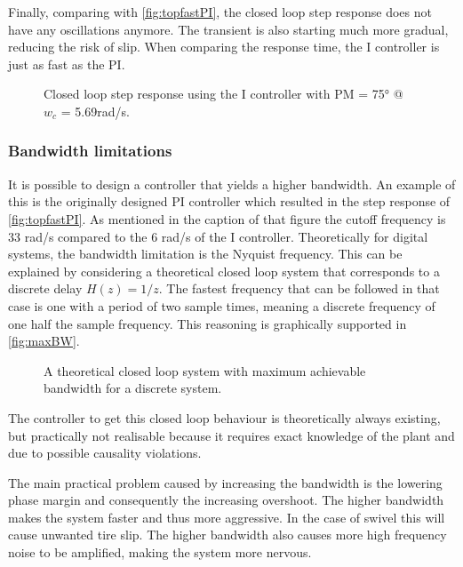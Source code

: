 \documentclass[a4paper]{article}
\newcommand{\newpar}{\vspace{.3cm}\noindent}
\begin{document}
\newpar
Finally, comparing with \autoref{fig:topfastPI}, the closed loop step response does not have any oscillations anymore. The transient is also starting much more gradual, reducing the risk of slip. When comparing the response time, the I controller is just as fast as the PI.

\begin{figure}[H]
    \caption{Closed loop step response using the I controller with PM = 75° @ $w_{c}$ = 5.69rad/s.}
    \label{fig:2_closedloopbode}
\end{figure}


\subsubsection{Bandwidth limitations}
It is possible to design a controller that yields a higher bandwidth. An example of this is the originally designed PI controller which resulted in the step response of \autoref{fig:topfastPI}. As mentioned in the caption of that figure the cutoff frequency is 33 rad/s compared to the 6 rad/s of the I controller. Theoretically for digital systems, the bandwidth limitation is the Nyquist frequency. This can be explained by considering a theoretical closed loop system that corresponds to a discrete delay $H(z) = 1/z$. The fastest frequency that can be followed in that case is one with a period of two sample times, meaning a discrete frequency of one half the sample frequency. This reasoning is graphically supported in \autoref{fig:maxBW}.

\begin{figure}[H]
    \caption{A theoretical closed loop system with maximum achievable bandwidth for a discrete system.}
    \label{fig:maxBW}
\end{figure}

\newpar
The controller to get this closed loop behaviour is theoretically always existing, but practically not realisable because it requires exact knowledge of the plant and due to possible causality violations. 

\newpar
The main practical problem caused by increasing the bandwidth is the lowering phase margin and consequently the increasing overshoot. The higher bandwidth makes the system faster and thus more aggressive. In the case of swivel this will cause unwanted tire slip. The higher bandwidth also causes more high frequency noise to be amplified, making the system more nervous.
\end{document}
